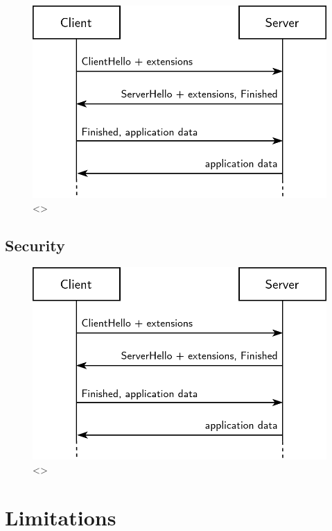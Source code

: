 \begin{figure}[ht]
\centerline{\includegraphics[width=120mm]{images/tls-handshake.png}}
\caption[TODO performance graph]{<>}
\label{performance_graph_figure}
\end{figure}

\subsection{Security}

\blindtext

\begin{figure}[ht]
\centerline{\includegraphics[width=120mm]{images/tls-handshake.png}}
\caption[TODO security graph using entropy or something]{<>}
\label{security_graph_figure}
\end{figure}








\section{Limitations}

